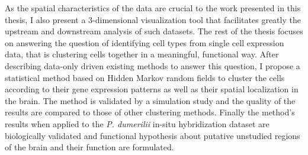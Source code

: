 \documentclass[paper=a4, fontsize=11pt]{scrartcl} %
\numberwithin{equation}{section} %
\numberwithin{figure}{section} %
\numberwithin{table}{section} %
\begin{document}
As the spatial characteristics of the data are crucial to the work presented in this thesis, I also present a 3-dimensional visualization tool that facilitates greatly the upstream and downstream analysis of such datasets. The rest of the thesis focuses on answering the question of identifying cell types from single cell expression data, that is clustering cells together in a meaningful, functional way. After describing data-only driven existing methods to answer this question, I propose a statistical method based on Hidden Markov random fields to cluster the cells according to their gene expression patterns as well as their spatial localization in the brain. The method is validated by a simulation study and the quality of the results are compared to those of other clustering methods. Finally the method's results when applied to the \emph{P. dumerilii} in-situ hybridization dataset are biologically validated and functional hypothesis about putative unstudied regions of the brain and their function are formulated.






\end{document}
